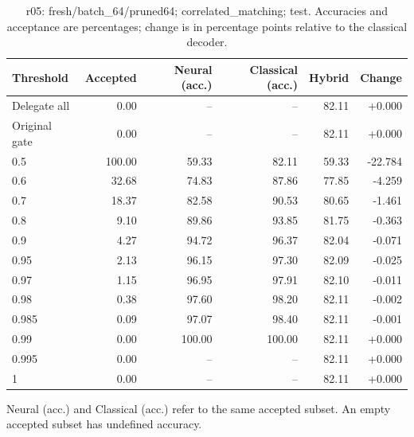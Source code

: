 \begin{table}[htbp]
\centering\small
\setlength{\tabcolsep}{3pt}
\caption{r05: fresh/batch\_64/pruned64; correlated\_matching; test. Accuracies and acceptance are percentages; change is in percentage points relative to the classical decoder.}
\begin{tabular}{lrrrrr}
\toprule
Threshold & Accepted & Neural (acc.) & Classical (acc.) & Hybrid & Change \\
\midrule
Delegate all & 0.00 & -- & -- & 82.11 & +0.000 \\
Original gate & 0.00 & -- & -- & 82.11 & +0.000 \\
0.5 & 100.00 & 59.33 & 82.11 & 59.33 & -22.784 \\
0.6 & 32.68 & 74.83 & 87.86 & 77.85 & -4.259 \\
0.7 & 18.37 & 82.58 & 90.53 & 80.65 & -1.461 \\
0.8 & 9.10 & 89.86 & 93.85 & 81.75 & -0.363 \\
0.9 & 4.27 & 94.72 & 96.37 & 82.04 & -0.071 \\
0.95 & 2.13 & 96.15 & 97.30 & 82.09 & -0.025 \\
0.97 & 1.15 & 96.95 & 97.91 & 82.10 & -0.011 \\
0.98 & 0.38 & 97.60 & 98.20 & 82.11 & -0.002 \\
0.985 & 0.09 & 97.07 & 98.40 & 82.11 & -0.001 \\
0.99 & 0.00 & 100.00 & 100.00 & 82.11 & +0.000 \\
0.995 & 0.00 & -- & -- & 82.11 & +0.000 \\
1 & 0.00 & -- & -- & 82.11 & +0.000 \\
\bottomrule
\end{tabular}
\par\smallskip\footnotesize Neural (acc.) and Classical (acc.) refer to the same accepted subset. An empty accepted subset has undefined accuracy.
\end{table}

